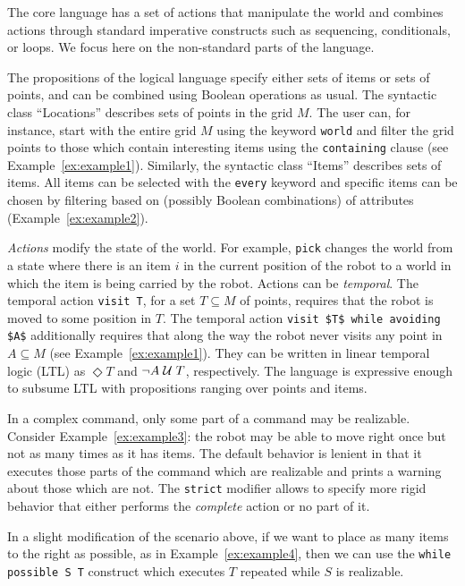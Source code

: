 The core language has a set of actions that manipulate the world and combines
actions through standard imperative constructs such as sequencing, conditionals, or loops.
We focus here on the non-standard parts of the language.

The propositions of the logical language specify either sets of items or sets of
points, and can be combined using Boolean operations as usual.
The syntactic class ``Locations'' describes sets of points in the grid $M$.
The user can, for instance, start with the entire grid $M$ using
the keyword \lstinline{world} and filter the grid points to those which
contain interesting items using the \lstinline{containing} clause
(see Example~\ref{ex:example1}).
Similarly, the syntactic class ``Items'' describes sets of items.
All items can be selected with the \lstinline{every} keyword and specific items can be chosen
by filtering based on (possibly Boolean combinations) of attributes
(Example~\ref{ex:example2}).

\emph{Actions} modify the state of the world. For example, \lstinline{pick} changes the
world from a state where there is an item $i$ in the current position of the
robot to a world in which the item is being carried by the robot.
Actions can be \emph{temporal}.
The temporal action \lstinline{visit T}, for a set $T\subseteq M$ of points,
requires that the robot is moved to some position in $T$.
The temporal action \lstinline{visit $T$ while avoiding $A$} additionally requires
that along the way the robot never visits any point in $A\subseteq M$
(see Example~\ref{ex:example1}).
They can be written in linear temporal logic (LTL) as $\Diamond T$ and $\lnot A\; \mathcal{U}\; T$,
respectively.
The language is expressive enough to subsume LTL with propositions ranging over points and
items.


In a complex command, only some part of a command may be realizable.
Consider Example~\ref{ex:example3}: the robot
may be able to move right once but not as many times as it has items.
The default behavior is lenient in that it executes those parts of the command
which are realizable and prints a warning about those which are not.
The \lstinline{strict} modifier allows to specify more rigid behavior that
either performs the \emph{complete} action or no part of it.

In a slight modification of the scenario above, if we want to place as many
items to the right as possible, as in Example~\ref{ex:example4}, then we can use
the \lstinline{while possible S T} construct which executes $T$ repeated while
$S$ is realizable.


